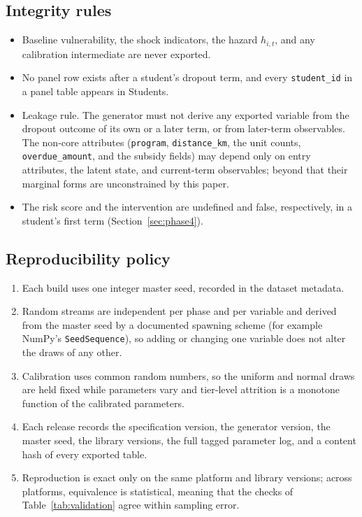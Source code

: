 \documentclass[11pt]{article}
\begin{document}
\subsection{Integrity rules}

\begingroup\sloppy
\begin{itemize}
\item Baseline vulnerability, the shock indicators, the hazard $h_{i,t}$, and any calibration intermediate are never exported.
\item No panel row exists after a student's dropout term, and every \texttt{student\_id} in a panel table appears in Students.
\item Leakage rule. The generator must not derive any exported variable from the dropout outcome of its own or a later term, or from later-term observables. The non-core attributes (\texttt{program}, \texttt{distance\_km}, the unit counts, \texttt{overdue\_amount}, and the subsidy fields) may depend only on entry attributes, the latent state, and current-term observables; beyond that their marginal forms are unconstrained by this paper.
\item The risk score and the intervention are undefined and false, respectively, in a student's first term (Section~\ref{sec:phase4}).
\end{itemize}
\endgroup

\subsection{Reproducibility policy}

\begingroup\sloppy
\begin{enumerate}
\item Each build uses one integer master seed, recorded in the dataset metadata.
\item Random streams are independent per phase and per variable and derived from the master seed by a documented spawning scheme (for example NumPy's \texttt{SeedSequence}), so adding or changing one variable does not alter the draws of any other.
\item Calibration uses common random numbers, so the uniform and normal draws are held fixed while parameters vary and tier-level attrition is a monotone function of the calibrated parameters.
\item Each release records the specification version, the generator version, the master seed, the library versions, the full tagged parameter log, and a content hash of every exported table.
\item Reproduction is exact only on the same platform and library versions; across platforms, equivalence is statistical, meaning that the checks of Table~\ref{tab:validation} agree within sampling error.
\end{enumerate}
\endgroup



\end{document}
